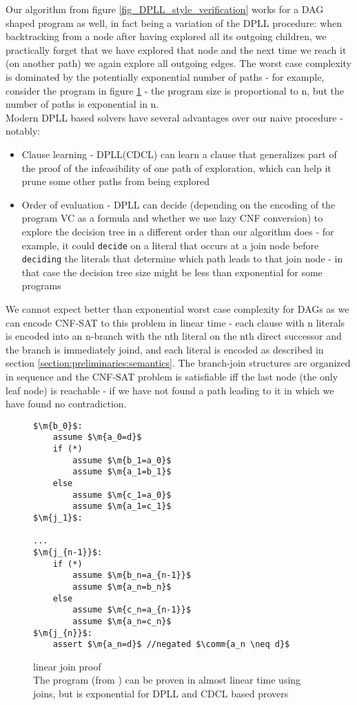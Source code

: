 Our algorithm from figure \ref{fig_DPLL_style_verification} works for a DAG shaped program as well, in fact being a variation of the DPLL procedure:  when backtracking from a node after having explored all its outgoing children, we practically forget that we have explored that node and the next time we reach it (on another path) we again explore all outgoing edges.
The worst case complexity is dominated by the potentially exponential number of paths - for example, consider the program in figure \ref{linear_join_proof} - the program size is proportional to n, but the number of paths is exponential in n.\\
Modern DPLL based solvers have several advantages over our naive procedure - notably:
\begin{itemize}
	\item Clause learning - DPLL(CDCL) can learn a clause that generalizes part of the proof of the infeasibility of one path of exploration, which can help it prune some other paths from being explored
	\item Order of evaluation - DPLL can decide (depending on the encoding of the program VC as a formula and whether we use lazy CNF conversion) to explore the decision tree in a different order than our algorithm does - for example, it could \lstinline|decide| on a literal that occurs at a join node before \lstinline|deciding| the literals that determine which path leads to that join node - in that case the decision tree size might be less than exponential for some programs
\end{itemize}
We cannot expect better than exponential worst case complexity for DAGs as we can encode CNF-SAT to this problem in linear time - each clause with n literals is encoded into an n-branch with the nth literal on the nth direct successor and the branch is immediately joind, and each literal is encoded as described in section \ref{section:preliminaries:semantics}.
The branch-join structures are organized in sequence and the CNF-SAT problem is satisfiable iff the last node (the only leaf node) is reachable - if we have not found a path leading to it in which we have found no contradiction.

\begin{figure}
\begin{lstlisting}
$\m{b_0}$:
	assume $\m{a_0=d}$
	if (*)
		assume $\m{b_1=a_0}$
		assume $\m{a_1=b_1}$
	else
		assume $\m{c_1=a_0}$
		assume $\m{a_1=c_1}$
$\m{j_1}$:

...
$\m{j_{n-1}}$:
	if (*)
		assume $\m{b_n=a_{n-1}}$
		assume $\m{a_n=b_n}$
	else
		assume $\m{c_n=a_{n-1}}$
		assume $\m{a_n=c_n}$
$\m{j_{n}}$:
	assert $\m{a_n=d}$ //negated $\comm{a_n \neq d}$
\end{lstlisting}
\caption{linear join proof\\
The program (from \cite{DPLLJoin}) can be proven in almost linear time using joins,
but is exponential for DPLL and CDCL based provers}
\label{linear_join_proof}
\end{figure}

